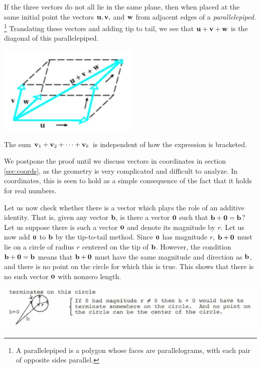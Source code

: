 \documentclass[12pt,letterpaper,reqno]{article}
\numberwithin{equation}{section}
\begin{document}
If the three vectors do not all lie in the same plane, then when placed at the same initial point the vectors ${\bf u}, {\bf v},$ and ${\bf w}$ from adjacent edges of a \emph{parallelepiped}. \footnote{A parallelepiped is a polygon whose faces are parallelograms, with each pair of opposite sides parallel.} Translating these vectors and adding tip to tail, we see that ${\bf u}+{\bf v}+{\bf w}$ is the diagonal of this parallelepiped.

\begin{center}
	\includegraphics[scale=0.5]{figures_mvc/volume_of_parallelepiped_vectors}
\end{center}

\begin{cor}
The sum ${\bf v}_1+{\bf v}_2+\cdots + {\bf v}_k$ is independent of how the expression is bracketed.	
\end{cor}

\begin{pf}
We postpone the proof until we discuss vectors in coordinates in section \ref{sec:coords}, as the geometry is very complicated and difficult to analyze. In coordinates, this is seen to hold as a simple consequence of the fact that it holds for real numbers.
\end{pf}

Let us now check whether there is a vector which plays the role of an additive identity. That is, given any vector ${\bf b}$, is there a vector ${\bf 0}$ such that ${\bf b}+{\bf 0}={\bf b}$? Let us suppose there is such a vector ${\bf 0}$ and denote its magnitude by $r$. Let us now add ${\bf 0}$ to ${\bf b}$ by the tip-to-tail method. Since ${\bf 0}$ has magnitude $r$, ${\bf b}+{\bf 0}$ must lie on a circle of radius $r$ centered on the tip of ${\bf b}$. However, the condition ${\bf b}+{\bf 0}={\bf b}$ means that ${\bf b}+{\bf 0}$ must have the same magnitude and direction as ${\bf b}$, and there is no point on the circle for which this is true. This shows that there is no such vector ${\bf 0}$ with nonzero length. 
\begin{center}
	\includegraphics[scale=0.5]{figures_mvc/b_plus_zero_circle}
\end{center}
\end{document}
